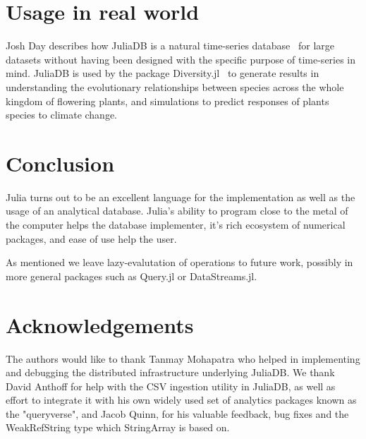 \documentclass{juliacon}
\begin{document}
\section{Usage in real world}

Josh Day describes how JuliaDB is a natural time-series database~\cite{wilmott2018} for large datasets without having been designed with the specific purpose of time-series in mind. JuliaDB is used by the package Diversity.jl~\cite{claireh2018} to generate results in understanding the evolutionary relationships between species across the whole kingdom of flowering plants, and simulations to predict responses of plants species to climate change.

\section{Conclusion}

Julia turns out to be an excellent language for the implementation as well as the usage of an analytical database. Julia's ability to program close to the metal of the computer helps the database implementer, it's rich ecosystem of numerical packages, and ease of use help the user.

As mentioned we leave lazy-evalutation of operations to future work, possibly in more general packages such as Query.jl or DataStreams.jl.

\section{Acknowledgements}

The authors would like to thank Tanmay Mohapatra who helped in implementing and debugging the distributed infrastructure underlying JuliaDB. We thank David Anthoff for help with the CSV ingestion utility in JuliaDB, as well as effort to integrate it with his own widely used set of analytics packages known as the "queryverse", and Jacob Quinn, for his valuable feedback, bug fixes and the WeakRefString type which StringArray is based on.


\end{document}
